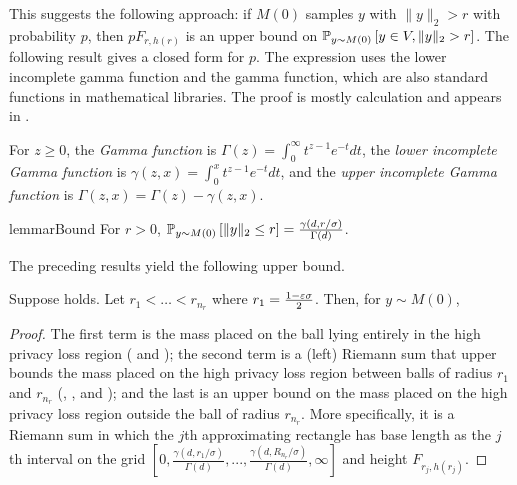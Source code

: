This suggests the following approach: if $M(0)$ samples $y$ with $\|y\|_2 > r$ with probability $p$, then $pF_{r,h(r)}$ is an upper bound on $\P{y\sim M(0)}{y \in V, \|y\|_2 > r}$. The following result gives a closed form for $p$. The expression uses the lower incomplete gamma function and the gamma function, which are also standard functions in mathematical libraries. The proof is mostly calculation and appears in .

\begin{definition}
\label{def:gammas}
    For $z \geq 0$, the \emph{Gamma function} is $\Gamma(z) = \int_0^\infty t^{z-1}e^{-t} dt$, the \emph{lower incomplete Gamma function} is $\gamma(z, x) = \int_0^x t^{z-1}e^{-t}dt$, and the \emph{upper incomplete Gamma function} is $\Gamma(z, x) = \Gamma(z) - \gamma(z, x)$.
\end{definition} 

\begin{restatable}{lemma}{rBound}
\label{lem:r_bound}
    For $r > 0$, $\P{y \sim M(0)}{\|y\|_2 \leq r} = \frac{\gamma(d, r/\sigma)}{\Gamma(d)}$.
\end{restatable}

The preceding results yield the following upper bound.
\begin{lemma}
\label{lem:upper_bound}
    Suppose  holds. Let $r_1 < \ldots < r_{n_r}$ where $r_1 =\frac{1-\eps \sigma}{2}$. Then, for $y \sim M(0)$,
\end{lemma}
\begin{proof}
    The first term is the mass placed on the ball lying entirely in the high privacy loss region ( and ); the second term is a (left) Riemann sum that upper bounds the mass placed on the high privacy loss region between balls of radius $r_1$ and $r_{n_r}$ (, , and ); and the last is an upper bound on the mass placed on the high privacy loss region outside the ball of radius $r_{n_r}$. More specifically, it is a Riemann sum in which the $j$th approximating rectangle has base length as the $j$th interval on the grid $\left[0, \frac{\gamma(d, r_{1}/\sigma)}{\Gamma(d)},...,\frac{\gamma(d, R_{n_{r}}/\sigma)}{\Gamma(d)},\infty\right]$ and height $F_{r_{j},h(r_{j})}$.
\end{proof}

